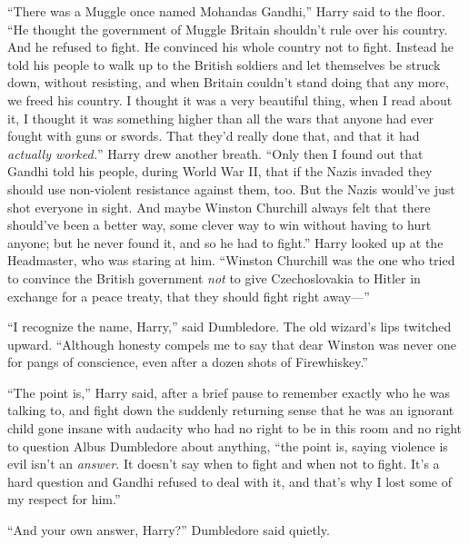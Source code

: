 “There was a Muggle once named Mohandas Gandhi,” Harry said to the floor. “He thought the government of Muggle Britain shouldn’t rule over his country. And he refused to fight. He convinced his whole country not to fight. Instead he told his people to walk up to the British soldiers and let themselves be struck down, without resisting, and when Britain couldn’t stand doing that any more, we freed his country. I thought it was a very beautiful thing, when I read about it, I thought it was something higher than all the wars that anyone had ever fought with guns or swords. That they’d really done that, and that it had \emph{actually worked.}” Harry drew another breath. “Only then I found out that Gandhi told his people, during World War II, that if the Nazis invaded they should use non-violent resistance against them, too. But the Nazis would’ve just shot everyone in sight. And maybe Winston Churchill always felt that there should’ve been a better way, some clever way to win without having to hurt anyone; but he never found it, and so he had to fight.” Harry looked up at the Headmaster, who was staring at him. “Winston Churchill was the one who tried to convince the British government \emph{not} to give Czechoslovakia to Hitler in exchange for a peace treaty, that they should fight right away—”

“I recognize the name, Harry,” said Dumbledore. The old wizard’s lips twitched upward. “Although honesty compels me to say that dear Winston was never one for pangs of conscience, even after a dozen shots of Firewhiskey.”

“The point is,” Harry said, after a brief pause to remember exactly who he was talking to, and fight down the suddenly returning sense that he was an ignorant child gone insane with audacity who had no right to be in this room and no right to question Albus Dumbledore about anything, “the point is, saying violence is evil isn’t an \emph{answer.} It doesn’t say when to fight and when not to fight. It’s a hard question and Gandhi refused to deal with it, and that’s why I lost some of my respect for him.”

“And your own answer, Harry?” Dumbledore said quietly.

